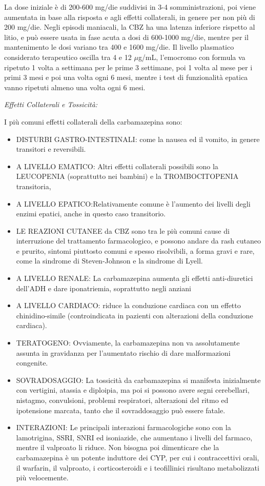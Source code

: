 \begin{itemize}
La dose iniziale è di 200-600 mg/die suddivisi in 3-4 somministrazioni,
poi viene aumentata in base alla risposta e agli effetti collaterali, in
genere per non più di 200 mg/die. Negli episodi maniacali, la CBZ ha una
latenza inferiore rispetto al litio, e può essere usata in fase acuta a
dosi di 600-1000 mg/die, mentre per il mantenimento le dosi variano tra
400 e 1600 mg/die. Il livello plasmatico considerato terapeutico oscilla
tra 4 e 12 $\mu$g/mL, l'emocromo con formula va ripetuto 1 volta a settimana
per le prime 3 settimane, poi 1 volta al mese per i primi 3 mesi e poi
una volta ogni 6 mesi, mentre i test di funzionalità epatica vanno
ripetuti almeno una volta ogni 6 mesi.

\emph{\emph{Effetti Collaterali e Tossicità:}}

I più comuni effetti collaterali della carbamazepina sono:

\begin{itemize}
\item
  DISTURBI GASTRO-INTESTINALI: come la nausea ed il vomito, in genere
  transitori e reversibili.
\item
  A LIVELLO EMATICO: Altri effetti collaterali possibili sono la
  LEUCOPENIA (soprattutto nei bambini) e la TROMBOCITOPENIA transitoria,
\item
  A LIVELLO EPATICO:Relativamente comune è l'aumento dei livelli degli
  enzimi epatici, anche in questo caso transitorio.
\item
  LE REAZIONI CUTANEE da CBZ sono tra le più comuni cause di
  interruzione del trattamento farmacologico, e possono andare da rash
  cutaneo e prurito, sintomi piuttosto comuni e spesso risolvibili, a
  forma gravi e rare, come la sindrome di Steven-Johnson e la sindrome
  di Lyell.
\item
  A LIVELLO RENALE: La carbamazepina aumenta gli effetti anti-diuretici
  dell'ADH e dare iponatriemia, soprattutto negli anziani
\item
  A LIVELLO CARDIACO: riduce la conduzione cardiaca con un effetto
  chinidino-simile (controindicata in pazienti con alterazioni della
  conduzione cardiaca).
\item
  TERATOGENO: Ovviamente, la carbamazepina non va assolutamente assunta
  in gravidanza per l'aumentato rischio di dare malformazioni congenite.
\item
  SOVRADOSAGGIO: La tossicità da carbamazepina si manifesta inizialmente
  con vertigini, atassia e diploipia, ma poi si possono avere segni
  cerebellari, nistagmo, convulsioni, problemi respiratori, alterazioni
  del ritmo ed ipotensione marcata, tanto che il sovraddosaggio può
  essere fatale.
\item
  INTERAZIONI: Le principali interazioni farmacologiche sono con la
  lamotrigina, SSRI, SNRI ed isoniazide, che aumentano i livelli del
  farmaco, mentre il valproato li riduce. Non bisogna poi dimenticare
  che la carbamazepina è un potente induttore dei CYP, per cui i
  contraccettivi orali, il warfarin, il valproato, i corticosteroidi e i
  teofillinici risultano metabolizzati più velocemente.
\end{itemize}


\end{itemize}
